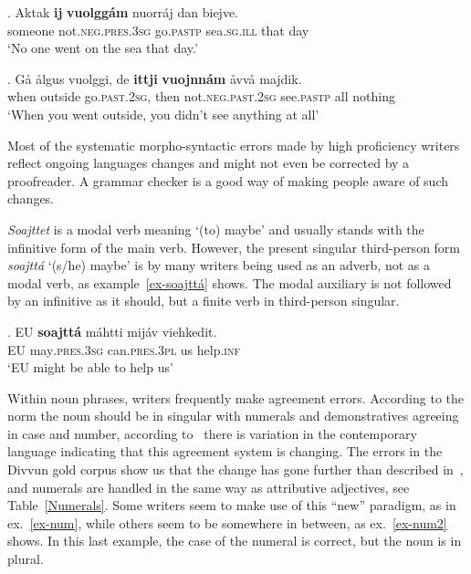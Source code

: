 \documentclass[free]{flammie}
\begin{document}
\exg. Aktak \textbf{ij} \textbf{vuolggám} nuorráj dan biejve.\label{ex-aktak}\\
someone not\textsc{.neg.pres.3sg} go\textsc{.pastp} sea\textsc{.sg.ill} that day
\\
`No one went on the sea that day.'

\exg. Gå ålgus vuolggi, de \textbf{ittji} \textbf{vuojnnám} åvvå
majdik.\label{ex-ittji}\\
when outside go\textsc{.past.2sg}, then not\textsc{.neg.past.2sg}
see\textsc{.pastp} all nothing \\
`When you went outside, you didn't see anything at all'

Most of the systematic morpho-syntactic errors made by high proficiency writers
reflect ongoing languages changes and might not even be corrected by a
proofreader. A grammar checker is a good way of making people aware of such
changes.

\textit{Soajttet} is a modal verb meaning `(to) maybe' and usually stands with
the infinitive form of the main verb. However, the present singular third-person
form \textit{soajttá} `(s/he) maybe' is by many writers being used as an adverb,
not as a modal verb, as example~\ref{ex-soajttá} shows. The modal auxiliary is
not followed by an infinitive as it should, but a finite verb in third-person
singular.

\exg. EU \textbf{soajttá} máhtti mijáv viehkedit.\label{ex-soajttá} \\
EU may\textsc{.pres.3sg} can\textsc{.pres.3pl} us help\textsc{.inf} \\
`EU might be able to help us'






Within noun phrases, writers frequently make agreement errors. According to the
norm the noun should be in singular with numerals and demonstratives agreeing in
case and number, according to~\cite{ylikoski2022lule} there is variation in the
contemporary language indicating that this agreement system is changing.  The
errors in the Divvun gold corpus show us that the change has gone further than
described in~\cite{ylikoski2022lule}, and numerals are handled in the same way as
attributive adjectives, see Table~\ref{Numerals}. Some writers seem to make use
of this ``new'' paradigm, as in ex.~\ref{ex-num}, while others seem to be
somewhere in between, as ex.~\ref{ex-num2} shows. In this last example, the case
of the numeral is correct, but the noun is in plural.
\end{document}
